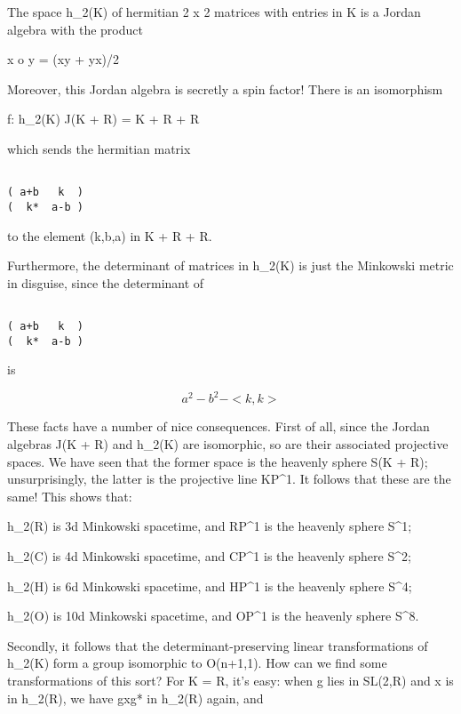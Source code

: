 The space h_{2}(K) of hermitian 2 x 2 matrices with entries in K is a
Jordan algebra with the product 

x o y = (xy + yx)/2

Moreover, this Jordan algebra is secretly a spin factor!  There is an 
isomorphism 

f: h_{2}(K) \to  J(K + R) = K + R + R

which sends the hermitian matrix


\begin{verbatim}

( a+b   k  )
(  k*  a-b )
\end{verbatim}
    

to the element (k,b,a) in K + R + R.

Furthermore, the determinant of matrices in h_{2}(K) is just the
Minkowski metric in disguise, since the determinant of


\begin{verbatim}

( a+b   k  ) 
(  k*  a-b )
\end{verbatim}
    
is


$$

a^{2} - b^{2} - <k,k>

$$
    
These facts have a number of nice consequences.  First of all, since the
Jordan algebras J(K + R) and h_{2}(K) are isomorphic, so are
their associated projective spaces.  We have seen that the former space
is the heavenly sphere S(K + R); unsurprisingly, the latter is the
projective line KP^{1}.  It follows that these are the same!
This shows that:

h_{2}(R) is 3d Minkowski spacetime, and RP^{1} is
the heavenly sphere S^{1};

h_{2}(C) is 4d Minkowski spacetime, and CP^{1} is the heavenly
sphere S^{2}; 

h_{2}(H) is 6d Minkowski spacetime, and HP^{1} is the
heavenly sphere S^{4};

h_{2}(O) is 10d Minkowski spacetime, and OP^{1} is the
heavenly sphere S^{8}.



Secondly, it follows that the determinant-preserving linear
transformations of h_{2}(K) form a group isomorphic to O(n+1,1).
How can we find some transformations of this sort?  For K = R, it's
easy: when g lies in SL(2,R) and x is in h_{2}(R), we have gxg*
in h_{2}(R) again, and

